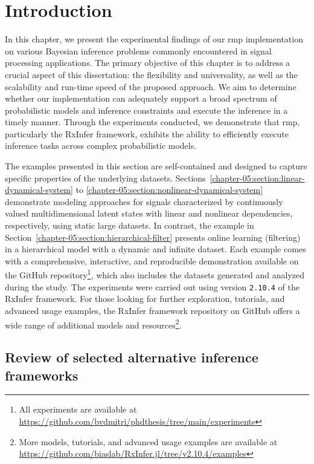 \section{Introduction}\label{chapter-05:section:introduction}

In this chapter, we present the experimental findings of our \ac{rmp} implementation on various
Bayesian inference problems commonly encountered in signal processing applications.
The primary objective of this chapter is to address a crucial aspect of this dissertation: the
flexibility and universality, as well as the scalability and run-time speed of the proposed approach.
We aim to determine whether our implementation can adequately support a broad spectrum of probabilistic models
and inference constraints and execute the inference in a timely manner.
Through the experiments conducted, we demonstrate that \ac{rmp}, particularly
the RxInfer framework, exhibits the ability to efficiently execute inference tasks across complex
probabilistic models.

The examples presented in this section are self-contained and designed to capture specific
properties of the underlying datasets.
Sections~\ref{chapter-05:section:linear-dynamical-system} to
\ref{chapter-05:section:nonlinear-dynamical-system} demonstrate modeling approaches for
signals characterized by continuously valued multidimensional latent states with linear and
nonlinear dependencies, respectively, using static large datasets.
In contrast, the example in Section~\ref{chapter-05:section:hierarchical-filter} presents
online learning (filtering) in a hierarchical model with a dynamic and infinite dataset.
Each example comes with a comprehensive, interactive, and reproducible demonstration available
on the GitHub repository\footnote{All experiments are available at
  \url{https://github.com/bvdmitri/phdthesis/tree/main/experiments}}, which also includes the datasets generated and
analyzed during the study.
The experiments were carried out using version \texttt{2.10.4} of the RxInfer framework.
For those looking for further exploration, tutorials, and advanced usage examples, the RxInfer
framework repository on GitHub offers a wide range of additional models and
resources\footnote{More models, tutorials, and advanced usage examples are available at
  \url{https://github.com/biaslab/RxInfer.jl/tree/v2.10.4/examples}}.

\subsection{Review of selected alternative inference frameworks}

